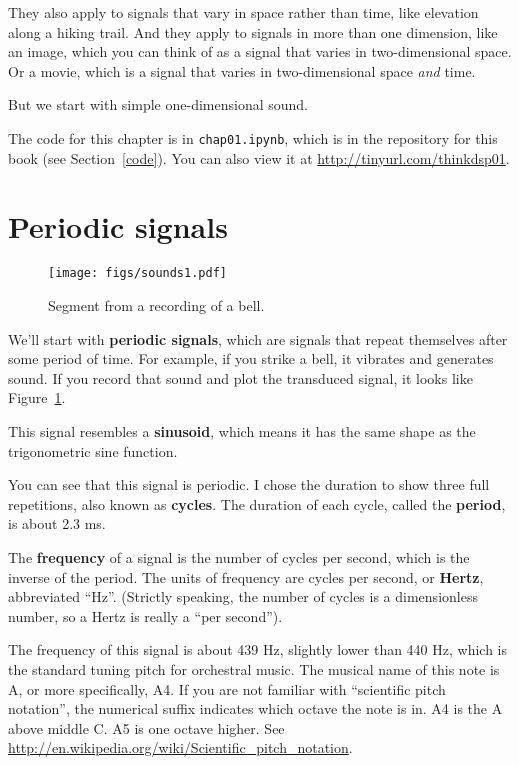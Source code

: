 \documentclass[12pt]{book} \usepackage[width=5.5in,height=8.5in, hmarginratio=3:2,vmarginratio=1:1]{geometry}
\begin{document}
They also apply to signals that vary in space rather than time, like elevation along a hiking trail. And they apply to signals in more than one dimension, like an image, which you can think of as a signal that varies in two-dimensional space. Or a movie, which is a signal that varies in two-dimensional space {\it and} time. 

But we start with simple one-dimensional sound. 

The code for this chapter is in {\tt chap01.ipynb}, which is in the repository for this book (see Section~\ref{code}). You can also view it at \url{http://tinyurl.com/thinkdsp01}. 

\section{Periodic signals} \label{violin} 

\begin{figure} 

\centerline{\texttt{[image: figs/sounds1.pdf]}} \caption{Segment from a recording of a bell.} \label{fig.sounds1} \end{figure} 

We'll start with {\bf periodic signals}, which are signals that repeat themselves after some period of time. For example, if you strike a bell, it vibrates and generates sound. If you record that sound and plot the transduced signal, it looks like Figure~\ref{fig.sounds1}. 

This signal resembles a {\bf sinusoid}, which means it has the same shape as the trigonometric sine function. 

You can see that this signal is periodic. I chose the duration to show three full repetitions, also known as {\bf cycles}. The duration of each cycle, called the {\bf period}, is about 2.3 ms. 

The {\bf frequency} of a signal is the number of cycles per second, which is the inverse of the period. The units of frequency are cycles per second, or {\bf Hertz}, abbreviated ``Hz''. (Strictly speaking, the number of cycles is a dimensionless number, so a Hertz is really a ``per second''). 

The frequency of this signal is about 439 Hz, slightly lower than 440 Hz, which is the standard tuning pitch for orchestral music. The musical name of this note is A, or more specifically, A4. If you are not familiar with ``scientific pitch notation'', the numerical suffix indicates which octave the note is in. A4 is the A above middle C. A5 is one octave higher. See \url{http://en.wikipedia.org/wiki/Scientific_pitch_notation}. 
\end{document}
